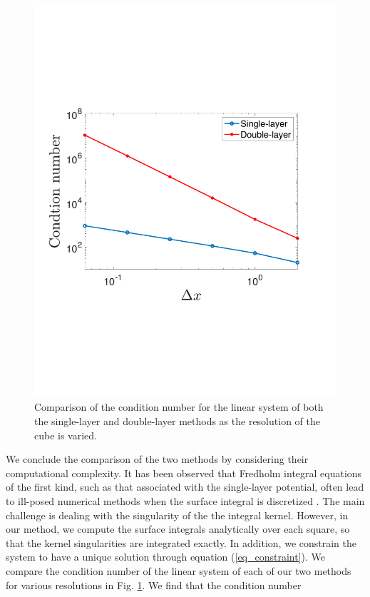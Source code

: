 \begin{figure}[ht]
	\begin{center}
		\hspace{0.1cm}
		\includegraphics[scale = 0.5]{./figures/fig_con_new}
	\end{center}
	\caption{Comparison of the condition number for the linear system of both the single-layer and double-layer methods as the resolution of the cube is varied. }
	\label{fig_condition_number}
\end{figure}
\par
We conclude the comparison of the two methods by considering their computational complexity.
It has been observed that Fredholm integral equations of the first kind, such as that associated with the single-layer potential, often lead to ill-posed numerical
methods when the surface integral is discretized \cite{delves_numerical_1974, karrila_integral_1989}.
The main challenge is dealing with the singularity of the 
the integral kernel. However, in our method, we compute the surface integrals analytically over each square, so that the kernel singularities are integrated exactly. In addition, we constrain the system to have a unique solution through equation (\ref{eq_constraint}). We compare the condition number of the linear system of each of our two methods for various resolutions in Fig. \ref{fig_condition_number}. We find that the condition number
